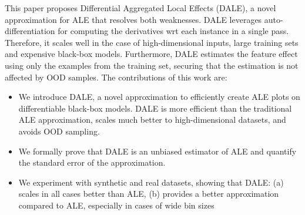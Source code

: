 This paper proposes Differential Aggregated Local Effects (DALE), a novel approximation for ALE that resolves both weaknesses. DALE leverages auto-differentiation for computing the derivatives wrt each instance in a single pass. Therefore, it scales well in the case of high-dimensional inputs, large training sets and expensive black-box models. Furthermore, DALE estimates the feature effect using only the examples from the training set, securing that the estimation is not affected by OOD samples.
%
The contributions of this work are:
%
\begin{itemize}
\item We introduce DALE, a novel approximation to efficiently create ALE plots on differentiable black-box models. DALE is more efficient than the traditional ALE approximation, scales much better to high-dimensional datasets, and avoids OOD sampling.
\item We formally prove that DALE is an unbiased estimator of ALE and quantify the standard error of the approximation.
\item We experiment with synthetic and real datasets, showing that DALE: (a) scales in all cases better than ALE, (b) provides a better approximation compared to ALE, especially in cases of wide bin sizes
\end{itemize}
